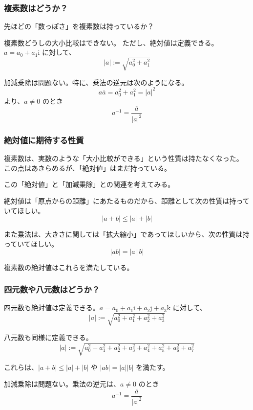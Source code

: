 \documentclass{beamer}
\newcommand{\ii}{\mathrm{i}}
\newcommand{\jj}{\mathrm{j}}
\newcommand{\kk}{\mathrm{k}}
\begin{document}
\begin{frame}
    \frametitle{複素数はどうか？}

    先ほどの「数っぽさ」を複素数は持っているか？

    \bigskip

    複素数どうしの大小比較はできない。
    ただし、絶対値は定義できる。\(a = a_0 + a_1 \ii\) に対して、
    \[
        |a| := \sqrt{a_0^2 + a_1^2}
    \]

    \bigskip

    加減乗除は問題ない。特に、乗法の逆元は次のようになる。
    \[
        a \overline{a} = a_0^2 + a_1^2 = |a|^2
    \]
    より、\(a \neq 0\) のとき
    \[
        a^{-1} = \frac{\overline{a}}{|a|^2}
    \]
\end{frame}

\begin{frame}
    \frametitle{絶対値に期待する性質}

    複素数は、実数のような「大小比較ができる」という性質は持たなくなった。
    この点はあきらめるが、「絶対値」はまだ持っている。

    この「絶対値」と「加減乗除」との関連を考えてみる。

    \bigskip

    絶対値は「原点からの距離」にあたるものだから、距離として次の性質は持っていてほしい。
    \[
        |a + b| \leq |a| + |b|
    \]

    また乗法は、大きさに関しては「拡大縮小」であってほしいから、次の性質は持っていてほしい。
    \[
        |ab| = |a||b|
    \]

    複素数の絶対値はこれらを満たしている。
\end{frame}

\begin{frame}
    \frametitle{四元数や八元数はどうか？}

    四元数も絶対値は定義できる。\(a = a_0 + a_1 \ii + a_2 \jj + a_3 \kk\) に対して、
    \[
        |a| := \sqrt{a_0^2 + a_1^2 + a_2^2 + a_3^2}
    \]

    八元数も同様に定義できる。
    \[
        |a| := \sqrt{a_0^2 + a_1^2 + a_2^2 + a_3^2 + a_4^2 + a_5^2 + a_6^2 + a_7^2}
    \]

    これらは、\(|a + b| \leq |a| + |b|\) や \(|ab| = |a||b|\) を満たす。

    \bigskip

    加減乗除は問題ない。乗法の逆元は、\(a \neq 0\) のとき
    \[
        a^{-1} = \frac{\overline{a}}{|a|^2}
    \]
\end{frame}
\end{document}
